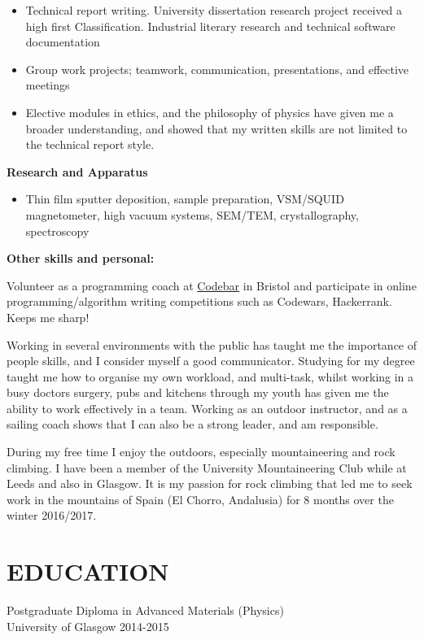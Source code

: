 \documentclass[margin, line, 10pt]{res} %
\begin{document}
\begin{resume}
\begin{itemize}
\item Technical report writing. University dissertation research project received a high first Classification. Industrial literary research and technical software documentation

\item Group work projects; teamwork, communication, presentations, and effective meetings

\item Elective modules in ethics, and the philosophy of physics have given me a broader understanding, and showed that my written skills are not limited to the technical report style.
\end{itemize}

\textbf{Research and Apparatus} 
\begin{itemize}
\item Thin film sputter deposition, sample preparation, VSM/SQUID magnetometer, high vacuum systems, SEM/TEM, crystallography, spectroscopy
\end{itemize}

\textbf{Other skills and personal:}

Volunteer as a programming coach at \href{https://codebar.io}{Codebar} in Bristol and participate in online programming/algorithm writing competitions such as Codewars, Hackerrank. Keeps me sharp!

Working in several environments with the public has taught me the importance of  people skills, and I consider myself a good communicator. Studying for my degree taught me how to organise my own workload, and multi-task, whilst working in a busy doctors surgery, pubs and kitchens through my youth has given me the ability to work effectively in a team. Working as an outdoor instructor, and as a sailing coach shows that I can also be a strong leader, and am responsible.\

During my free time I enjoy the outdoors, especially mountaineering and rock climbing. I have been a member of the University Mountaineering Club while at Leeds and also in Glasgow. It is my passion for rock climbing that led me to seek work in the mountains of Spain (El Chorro, Andalusia) for 8 months over the winter 2016/2017.

\section{EDUCATION}

Postgraduate Diploma in Advanced Materials (Physics)\\
University of Glasgow 2014-2015 \


\end{resume}
\end{document}
